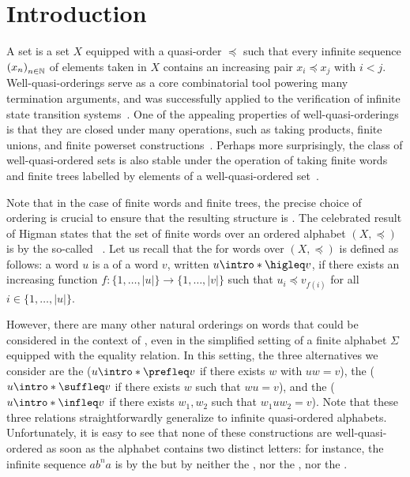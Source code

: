 \section{Introduction}
\label{introduction:sec}

\AP A  set is a set $X$ equipped with a quasi-order
$\preceq$ such that every infinite sequence $\seqof{x_n}$ of elements taken in
$X$ contains an increasing pair $x_i \preceq x_j$ with $i < j$. Well-quasi-orderings serve
as a core combinatorial tool powering many termination arguments, and was
successfully applied to the verification of infinite state transition
systems~\cite{ABDU96,ABDU98}. One of the appealing properties of
well-quasi-orderings is that they are closed under many operations, such as
taking products, finite unions, and finite powerset
constructions~\cite{SCSC12}. Perhaps more surprisingly, the class of
well-quasi-ordered sets is also stable under the operation of taking finite
words and finite trees labelled by elements of a well-quasi-ordered set~\cite{HIG52,KRU72}.

\AP Note that in the case of finite words and finite trees, the precise choice
of ordering is crucial to ensure that the resulting structure is
. The celebrated result of Higman states that the set of
finite words over an ordered alphabet $(X, \preceq)$ is 
by the so-called ~\cite{HIG52}. Let us recall
that the  for words over $(X, \preceq)$ is defined as
follows: a word $u$ is a  of a word $v$, written $u
\intro*\higleq v$, if there exists an increasing function $f \colon \{1,
\ldots, |u|\} \to \{1, \ldots, |v|\}$ such that $u_i \preceq v_{f(i)}$ for all
$i \in \{1, \ldots, |u|\}$.

\AP However, there are many other natural orderings on words that could be
considered in the context of , even in the simplified
setting of a finite alphabet $\Sigma$ equipped with the equality relation. In
this setting, the three alternatives we consider are the  ($u \intro*\prefleq v$ if there exists $w$ with $uw = v$), the
 ($u \intro*\suffleq v$ if there exists $w$ such that
$wu = v$), and the  ($u \intro*\infleq v$ if there exists
$w_1,w_2$ such that $w_1 u w_2 = v$). Note that these three relations
straightforwardly generalize to infinite quasi-ordered alphabets.
Unfortunately, it is easy to see that none of these constructions are 
well-quasi-ordered as soon as the alphabet contains two distinct letters:
for instance, the infinite sequence $a b^n a$ is  by
the  but by neither the , nor the
, nor the .

